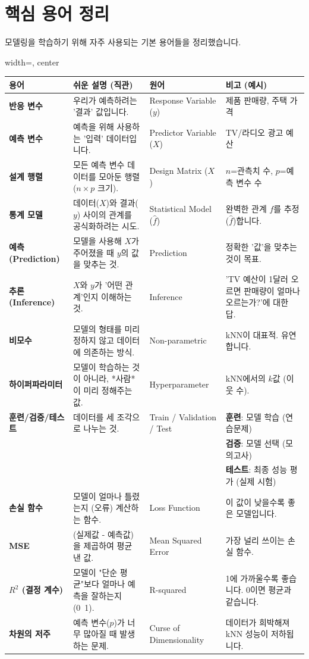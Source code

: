 \documentclass[11pt,a4paper]{book}
\theoremstyle{definition}
\begin{document}
\section{핵심 용어 정리}

모델링을 학습하기 위해 자주 사용되는 기본 용어들을 정리했습니다.

\begin{adjustbox}{width=\textwidth, center}
    \begin{tabular}{lp{5cm}lp{4cm}}
        \toprule
        \textbf{용어} & \textbf{쉬운 설명 (직관)} & \textbf{원어} & \textbf{비고 (예시)} \\
        \midrule
        \textbf{반응 변수} & 우리가 예측하려는 '결과' 값입니다. & Response Variable ($y$) & 제품 판매량, 주택 가격 \\
        \textbf{예측 변수} & 예측을 위해 사용하는 '입력' 데이터입니다. & Predictor Variable ($X$) & TV/라디오 광고 예산 \\
        \textbf{설계 행렬} & 모든 예측 변수 데이터를 모아둔 행렬 ($n \times p$ 크기). & Design Matrix ($X$) & $n$=관측치 수, $p$=예측 변수 수 \\
        \textbf{통계 모델} & 데이터($X$)와 결과($y$) 사이의 관계를 공식화하려는 시도. & Statistical Model ($\hat{f}$) & 완벽한 관계 $f$를 추정($\hat{f}$)합니다. \\
        \textbf{예측 (Prediction)} & 모델을 사용해 $X$가 주어졌을 때 $y$의 값을 맞추는 것. & Prediction & 정확한 '값'을 맞추는 것이 목표. \\
        \textbf{추론 (Inference)} & $X$와 $y$가 '어떤 관계'인지 이해하는 것. & Inference & 'TV 예산이 1달러 오르면 판매량이 얼마나 오르는가?'에 대한 답. \\
        \textbf{비모수} & 모델의 형태를 미리 정하지 않고 데이터에 의존하는 방식. & Non-parametric & kNN이 대표적. 유연합니다. \\
        \textbf{하이퍼파라미터} & 모델이 학습하는 것이 아니라, *사람*이 미리 정해주는 값. & Hyperparameter & kNN에서의 $k$값 (이웃 수). \\
        \textbf{훈련/검증/테스트} & 데이터를 세 조각으로 나누는 것. & Train / Validation / Test & \textbf{훈련}: 모델 학습 (연습문제) \\
        & & & \textbf{검증}: 모델 선택 (모의고사) \\
        & & & \textbf{테스트}: 최종 성능 평가 (실제 시험) \\
        \textbf{손실 함수} & 모델이 얼마나 틀렸는지 (오류) 계산하는 함수. & Loss Function & 이 값이 낮을수록 좋은 모델입니다. \\
        \textbf{MSE} & (실제값 - 예측값)을 제곱하여 평균 낸 값. & Mean Squared Error & 가장 널리 쓰이는 손실 함수. \\
        \textbf{$R^2$ (결정 계수)} & 모델이 "단순 평균"보다 얼마나 예측을 잘하는지 (0~1). & R-squared & 1에 가까울수록 좋습니다. 0이면 평균과 같습니다. \\
        \textbf{차원의 저주} & 예측 변수($p$)가 너무 많아질 때 발생하는 문제. & Curse of Dimensionality & 데이터가 희박해져 kNN 성능이 저하됩니다. \\
        \bottomrule
    \end{tabular}
\end{adjustbox}
\end{document}
